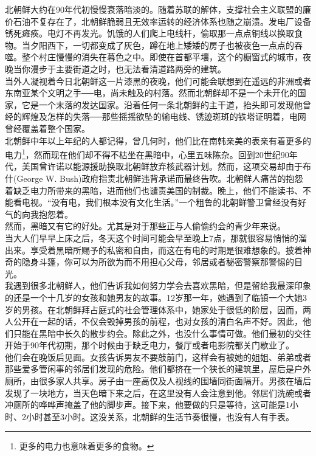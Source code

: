 北朝鲜大约在90年代初慢慢衰落暗淡的。随着苏联的解体，支撑社会主义联盟的廉价石油不复存在了，北朝鲜脆弱且无效率运转的经济体系也随之崩溃。发电厂设备锈死瘫痪。电灯不再发光。饥饿的人们爬上电线杆，偷取那一点点铜线以换取食物。当夕阳西下，一切都变成了灰色，蹲在地上矮矮的房子也被夜色一点点的吞噬。整个村庄慢慢的消失在暮色之中。即使在首都平壤，这个的橱窗式的城市，夜晚当你漫步于主要街道之时，也无法看清道路两旁的建筑。\\

当外人凝视着今日北朝鲜这一片漆黑的夜晚，他们可能会联想到在遥远的非洲或者东南亚某个文明之手──电，尚未触及的村落。然而北朝鲜却不是一个未开化的国家，它是一个末落的发达国家。沿着任何一条北朝鲜的主干道，抬头即可发现他曾经的辉煌及怎样的失落──那些摇摇欲坠的输电线、锈迹斑斑的铁塔证明着，电网曾经覆盖着整个国家。\\

北朝鲜中年以上年纪的人都记得，曾几何时，他们比在南韩亲美的表亲有着更多的电力\footnote{更多的电力也意味着更多的食物。}，然而现在他们却不得不枯坐在黑暗中，心里五味陈杂。回到20世纪90年代，美国曾许诺以能源援助换取北朝鲜放弃核武器计划。然而，这项交易却由于布什(George W. Bush)政府指责北朝鲜违背承诺而最终告吹。北朝鲜人痛苦的抱怨着缺乏电力所带来的黑暗，进而他们也谴责美国的制裁。晚上，他们不能读书、不能看电视。“没有电，我们根本没有文化生活。”一个粗鲁的北朝鲜警卫曾经没有好气的向我抱怨着。\\

然而，黑暗又有它的好处。尤其是对于那些正与人偷偷约会的青少年来说。\\

当大人们早早上床之后，冬天这个时间可能会早至晚上7点，那就很容易悄悄的溜出来。享受着黑暗所赐予的私密和自由，而这在有电的时期是很难想象的。披着神奇的隐身斗篷，你可以为所欲为而不用担心父母，邻居或者秘密警察那警惕的目光。\\

我遇到很多北朝鲜人，他们告诉我如何努力学会去喜欢黑暗，但是留给我最深印象的还是一个十几岁的女孩和她男友的故事。12岁那一年，她遇到了临镇一个大她3岁的男孩。在北朝鲜拜占庭式的社会管理体系中，她家处于很低的阶层，因而，两人公开在一起的话，不仅会毁掉男孩的前程，也对女孩的清白名声不好。因此，他们只能在黑暗中长久的散步约会。除此之外，也没什么事情可做。他们最初的交往开始于90年代初期，那个时候由于缺乏电力，餐厅或者电影院都关门歇业了。\\

他们会在晚饭后见面。女孩告诉男友不要敲前门，这样会有被她的姐姐、弟弟或者那些爱多管闲事的邻居们发现的危险。他们都挤在一个狭长的建筑里，屋后是户外厕所，由很多家人共享。房子由一座高仅及人视线的围墙同街面隔开。男孩在墙后发现了一块地方，当天色暗下来之后，在这里没有人会注意到他。邻居们洗碗或者冲厕所的哗哗声掩盖了他的脚步声。接下来，他要做的只是等待，这可能是1小时、2小时甚至3小时。这没关系，北朝鲜的生活节奏很慢，也没有人有手表。\\

